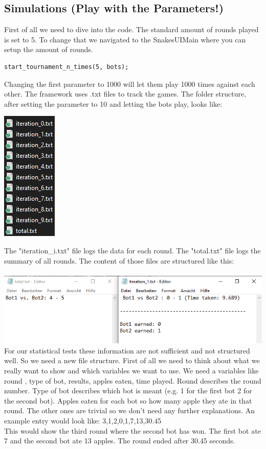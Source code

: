 \documentclass[a4paper,12pt]{article}
\begin{document}
\subsection{Simulations (Play with the Parameters!)}
First of all we need to dive into the code. The standard amount of rounds played is set to 5. To change that we navigated to the SnakesUIMain where you can setup the amount of rounds.
\begin{verbatim}
start_tournament_n_times(5, bots);
\end{verbatim}
Changing the first parameter to 1000 will let them play 1000 times against each other. The framework uses .txt files to track the games. The folder structure, after setting the parameter to 10 and letting the bots play, looks like:

\begin{center}
\includegraphics[scale=0.8]{logs_structure}
\end{center}

The "iteration\_i.txt" file logs the data for each round. The "total.txt" file logs the summary of all rounds. The content of those files are structured like this:\\
\\
\includegraphics[scale=0.8]{logs_content}
\\For our statistical tests these information are not sufficient and not structured well. So we need a new file structure. First of all we need to think about what we really want to show and which variables we want to use. We need a variables like round , type of bot, results, apples eaten, time played. Round describes the round number. Type of bot describes which bot is meant (e.g. 1 for the first bot 2 for the second bot). Apples eaten for each bot so how many apple they ate in that round. The other ones are trivial so we don't need any further explanations. An example entry would look like: 3,1,2,0,1,7,13,30.45
\\ This would show the third round where the second bot has won. The first bot ate 7 and the second bot ate 13 apples. The round ended after 30.45 seconds.
\end{document}
